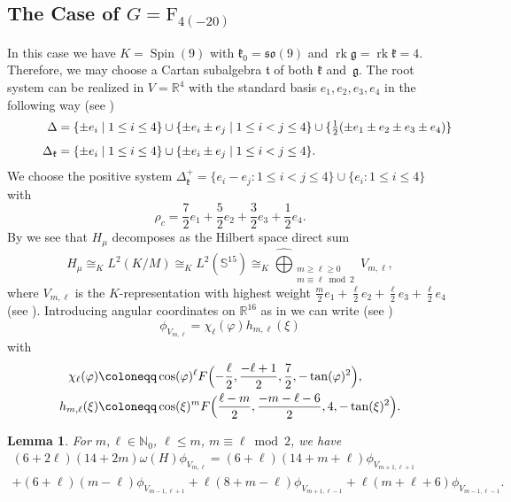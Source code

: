 \documentclass[JEP,XML,SOM,NoFloatCountersInSection,Unicode,published]{cedram}
\newtheorem{lemma}[theorem]{Lemma}
\theoremstyle{definition}
\newcommand{\Bhyp}[4]{\ensuremath{F\Bigl(#1,#2,#3,#4\Bigr)}}
\newcommand{\mb}[1]{\ensuremath{\mathbb{#1}}}
\newcommand{\mf}[1]{\ensuremath{\mathfrak{#1}}}
\newcommand{\on}[1]{\ensuremath{\operatorname{#1}}}
\newcommand{\rhoc}{\ensuremath{\rho_c}}
\newcommand{\R}{\ensuremath{\mathbb{R}}}
\newcommand{\N}{\ensuremath{\mathbb{N}}}
\newcommand{\pst}[1]{\ensuremath{H_{#1}}}
\newcommand{\GF}{\ensuremath{\mathrm{F}_{4(-20)}}}
\begin{document}
\subsection{\texorpdfstring{The Case of $G=\GF$}{The Case of G=F4(-20)}}
In this case we have $K=\on{Spin}(9)$ with $\mf k_0=\mf{so}(9)$ and $\on{rk}\mf g=\on{rk}\mf k=4$. Therefore, we may choose a Cartan subalgebra $\mf t$ of both $\mf k$ and~$\mf g$. The root system can be realized in $V=\R^4$ with the standard basis $e_1,e_2,e_3,e_4$ in the following way (see \cite[Plate\,VIII]{B02})
\begin{align}\label{eq:roots_F}
\hspace*{1cm}\Delta&=\{\pm e_i\mid 1\leq i\leq 4\}\cup\{\pm e_i\pm e_j\mid 1\leq i<j\leq 4\}\cup\{\tfrac{1}{2}(\pm e_1\pm e_2\pm e_3\pm e_4)\}\notag\\[-5pt]&\\[-5pt]
\hspace*{1cm}\Delta_\mf k&=\{\pm e_i\mid 1\leq i\leq 4\}\cup\{\pm e_i\pm e_j\mid 1\leq i<j\leq 4\}.\notag
\end{align}
We choose the positive system $\Delta^+_\mf k=\{e_i-e_j\colon 1\leq i<j\leq 4\}\cup\{e_i\colon 1\leq i\leq 4\}$ with
\[
\rhoc=\frac{7}{2}e_1+\frac{5}{2}e_2+\frac{3}{2}e_3+\frac{1}{2}e_4.
\]
By \cite[Th.\,3.1]{JW2} we see that $\pst{\mu}$ decomposes as the Hilbert space direct sum
\begin{equation}\label{eq:app_KM_sphere_iso_F}
\pst{\mu}\cong_KL^2(K/M)\cong_KL^2(\mb S^{15})\cong_K\widehat\bigoplus_{\substack{m\geq\ell\geq 0\\m \equiv\ell\bmod 2}}V_{m,\ell},
\end{equation}
where $V_{m,\ell}$ is the $K$-representation with highest weight $\frac m2e_1+\frac\ell2 e_2+\frac\ell2 e_3+\frac\ell2 e_4$ (see \cite[p.\,278]{JW2}).
Introducing angular coordinates on $\R^{16}$ as in \cite[p.\,275]{JW2} we can write (see \cite[Th.\,3.1]{JW2})
\[
\phi_{V_{m,\ell}}=\chi_\ell(\varphi)h_{m,\ell}(\xi)
\]
with
\begin{align*}
\chi_\ell(\varphi)&\coloneqq\cos(\varphi)^\ell\Bhyp{-\frac{\ell}{2}}{\frac{-\ell+1}{2}}{\frac{7}{2}}{-\tan(\varphi)^2},\\
h_{m,\ell}(\xi)&\coloneqq\cos(\xi)^m\Bhyp{\frac{\ell-m}{2}}{\frac{-m-\ell-6}{2}}{4}{-\tan(\xi)^2}.
\end{align*}

\begin{lemma}\label{la:decomp_omega_F}
For $m,\ell\in\N_0$, $\ell\leq m$, $m\equiv\ell\bmod2$, we have
\begin{multline*}
(6+2\ell)(14+2m)\omega(H)\phi_{V_{m,\ell}}=(6+\ell)(14+m+\ell)\phi_{V_{m+1,\ell+1}}\\
+(6+\ell)(m-\ell)\phi_{V_{m-1,\ell+1}}
+\ell(8+m-\ell)\phi_{V_{m+1,\ell-1}}+\ell(m+\ell+6)\phi_{V_{m-1,\ell-1}}.
\end{multline*}
\end{lemma}
\end{document}
